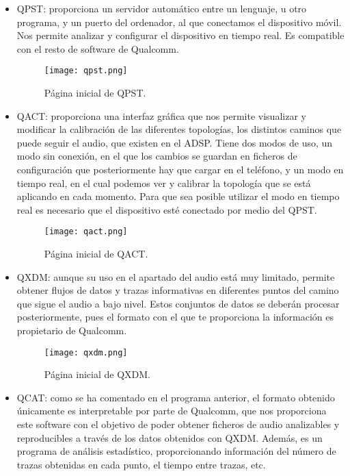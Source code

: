 \begin{itemize}
	\item{\gls{QPST}: proporciona un servidor automático entre un lenguaje, u otro programa, y un puerto del ordenador, al que conectamos el dispositivo móvil. Nos permite analizar y configurar el dispositivo en tiempo real. Es compatible con el resto de software de Qualcomm.}
	\begin{figure}[H]
		\centering
		\texttt{[image: qpst.png]}
		\caption{Página inicial de QPST.}
		\label{fig:qpst}
	\end{figure}
	\item{\gls{QACT}: proporciona una interfaz gráfica que nos permite visualizar y modificar la calibración de las diferentes topologías, los distintos caminos que puede seguir el audio, que existen en el \gls{ADSP}. Tiene dos modos de uso, un modo sin conexión, en el que los cambios se guardan en ficheros de configuración que posteriormente hay que cargar en el teléfono, y un modo en tiempo real, en el cual podemos ver y calibrar la topología que se está aplicando en cada momento. Para que sea posible utilizar el modo en tiempo real es necesario que el dispositivo esté conectado por medio del \gls{QPST}.}
	\begin{figure}[H]
		\centering
		\texttt{[image: qact.png]}
		\caption{Página inicial de QACT.}
		\label{fig:qact}
	\end{figure}	
	\item{\gls{QXDM}: aunque su uso en el apartado del audio está muy limitado, permite obtener flujos de datos y trazas informativas en diferentes puntos del camino que sigue el audio a bajo nivel. Estos conjuntos de datos se deberán procesar posteriormente, pues el formato con el que te proporciona la información es propietario de Qualcomm.}
	\begin{figure}[H]
		\centering
		\texttt{[image: qxdm.png]}
		\caption{Página inicial de QXDM.}
		\label{fig:qxdm}
	\end{figure}		
	\item{\gls{QCAT}: como se ha comentado en el programa anterior, el formato obtenido únicamente es interpretable por parte de Qualcomm, que nos proporciona este software con el objetivo de poder obtener ficheros de audio analizables y reproducibles a través de los datos obtenidos con \gls{QXDM}. Además, es un programa de análisis estadístico, proporcionando información del número de trazas obtenidas en cada punto, el tiempo entre trazas, etc.}
	\begin{figure}[H]

\end{figure}
\end{itemize}
